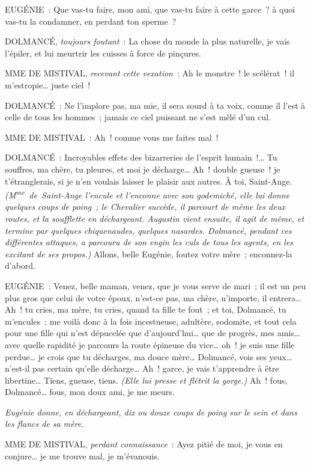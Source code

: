 \documentclass[french,twoside]{book} %
\begin{document}
EUGÉNIE : Que vas-tu faire, mon ami, que vas-tu faire à cette garce ? à quoi vas-tu la condamner, en perdant ton sperme ?\par
DOLMANCÉ, {\itshape toujours foutant} : La chose du monde la plus naturelle, je vais l’épiler, et lui meurtrir les cuisses à force de pinçures.\par
MME DE MISTIVAL, {\itshape recevant cette vexation} : Ah le monstre ! le scélérat ! il m’estropie… juste ciel !\par
DOLMANCÉ : Ne l’implore pas, ma mie, il sera sourd à ta voix, comme il l’est à celle de tous les hommes ; jamais ce ciel puissant ne s’est mêlé d’un cul.\par
MME DE MISTIVAL : Ah ! comme vous me faites mal !\par
DOLMANCÉ : Incroyables effets des bizarreries de l’esprit humain !… Tu souffres, ma chère, tu pleures, et moi je décharge… Ah ! double gueuse ! je t’étranglerais, si je n’en voulais laisser le plaisir aux autres. À toi, Saint-Ange. {\itshape (M\textsuperscript{me} de Saint-Ange l’encule et l’enconne avec son godemiché, elle lui donne quelques coups de poing ; le Chevalier succède, il parcourt de même les deux routes, et la soufflette en déchargeant. Augustin vient ensuite, il agit de même, et termine par quelques chiquenaudes, quelques nasardes. Dolmancé, pendant ces différentes attaques, a parcouru de son engin les culs de tous les agents, en les excitant de ses propos.)} Allons, belle Eugénie, foutez votre mère ; enconnez-la d’abord.\par
EUGÉNIE : Venez, belle maman, venez, que je vous serve de mari ; il est un peu plus gros que celui de votre époux, n’est-ce pas, ma chère, n’importe, il entrera… Ah ! tu cries, ma mère, tu cries, quand ta fille te fout ; et toi, Dolmancé, tu m’encules ; me voilà donc à la fois incestueuse, adultère, sodomite, et tout cela pour une fille qui n’est dépucelée que d’aujourd’hui… que de progrès, mes amis… avec quelle rapidité je parcours la route épineuse du vice… oh ! je suis une fille perdue… je crois que tu décharges, ma douce mère… Dolmancé, vois ses yeux… n’est-il pas certain qu’elle décharge… Ah ! garce, je vais t’apprendre à être libertine… Tiens, gueuse, tiens. {\itshape (Elle lui presse et flétrit la gorge.)} Ah ! fous, Dolmancé… fous, mon doux ami, je me meurs.\par
{\itshape Eugénie donne, en déchargeant, dix ou douze coups de poing sur le sein et dans les flancs de sa mère.}\par
MME DE MISTIVAL, {\itshape perdant connaissance} : Ayez pitié de moi, je vous en conjure… je me trouve mal, je m’évanouis.\par
\end{document}
